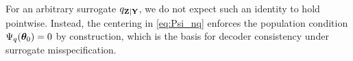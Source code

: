 For an arbitrary surrogate $q_{{\bf Z}\mid{\bf Y}}$, we do not expect such an identity to hold pointwise.
Instead, the centering in \eqref{eq:Psi_nq} enforces the population condition
$\Psi_q({\bm{\theta}}_0)=0$ by construction, which is the basis for decoder consistency under surrogate
misspecification.








